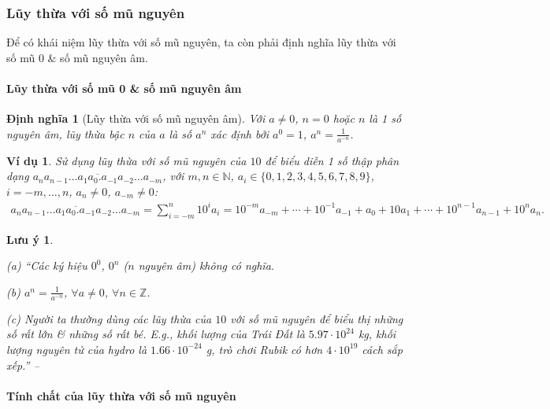 \documentclass{article}
\numberwithin{equation}{section}
\newtheorem{dinhnghia}{Định nghĩa}[section]
\newtheorem{vidu}{Ví dụ}[section]
\newtheorem{luuy}{Lưu ý}[section]
\begin{document}
\subsubsection{Lũy thừa với số mũ nguyên}
Để có khái niệm lũy thừa với số mũ nguyên, ta còn phải định nghĩa lũy thừa với số mũ 0 \& số mũ nguyên âm.

\paragraph{Lũy thừa với số mũ 0 \& số mũ nguyên âm}

\begin{dinhnghia}[Lũy thừa với số mũ nguyên âm]
	Với $a\ne 0$, $n = 0$ hoặc $n$ là 1 số nguyên âm, \emph{lũy thừa bậc $n$ của $a$} là số $a^n$ xác định bởi $a^0 = 1$, $a^n = \frac{1}{a^{-n}}$.
\end{dinhnghia}

\begin{vidu}
	Sử dụng lũy thừa với số mũ nguyên của $10$ để biểu diễn 1 số thập phân dạng $\overline{a_na_{n-1}\ldots a_1a_0.a_{-1}a_{-2}\ldots a_{-m}}$, với $m,n\in\mathbb{N}$, $a_i\in\{0,1,2,3,4,5,6,7,8,9\}$, $i = -m,\ldots,n$, $a_n\ne 0$, $a_{-m}\ne 0$:
	\begin{align*}
		\overline{a_na_{n-1}\ldots a_1a_0.a_{-1}a_{-2}\ldots a_{-m}} = \sum_{i=-m}^n 10^ia_i = 10^{-m}a_{-m} + \cdots + 10^{-1}a_{-1} + a_0 + 10a_1 + \cdots + 10^{n-1}a_{n-1} + 10^na_n.
	\end{align*}
\end{vidu}

\begin{luuy}
	\begin{enumerate*}
		\item[(a)] ``Các ký hiệu $0^0$, $0^n$ ($n$ nguyên âm) không có nghĩa.
		\item[(b)] $a^n = \frac{1}{a^{-n}}$, $\forall a\ne 0$, $\forall n\in\mathbb{Z}$.
		\item[(c)] Người ta thường dùng các lũy thừa của $10$ với số mũ nguyên để biểu thị những số rất lớn \& những số rất bé. E.g., khối lượng của Trái Đất là $5.97\cdot 10^{24}$ kg, khối lượng nguyên tử của hydro là $1.66\cdot 10^{-24}$ g, trò chơi Rubik có hơn $4\cdot 10^{19}$ cách sắp xếp.'' -- \cite[p. 70]{SGK_Toan_12_giai_tich_nang_cao}
	\end{enumerate*}
\end{luuy}

\paragraph{Tính chất của lũy thừa với số mũ nguyên}
\end{document}
